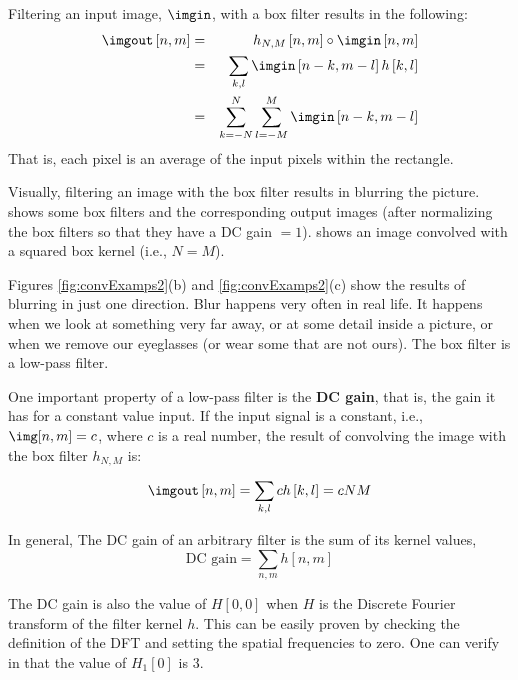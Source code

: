 Filtering an input image, $\imgin$, with a box filter results in the following:
\begin{eqnarray}
\imgout \left[n,m\right] &=& h_{N,M} \left[n,m\right] \circ \imgin \left[n,m\right] \nonumber \\
&=&  \sum_{k,l} \imgin \left[n-k,m-l \right] h \left[k,l \right] \nonumber \\
&=&  \sum_{k=-N}^N \sum_{l=-M}^M \imgin \left[n-k,m-l \right]
\end{eqnarray}
That is, each pixel is an average of the input pixels within the rectangle. 

Visually, filtering an image with the box filter results in blurring the picture. \Fig{\ref{fig:convExamps2}} shows some box filters and the corresponding output images (after normalizing the box filters so that they have a DC gain $= 1$).  shows an image convolved with a squared box kernel (i.e., $N=M$). 

Figures \ref{fig:convExamps2}(b) and \ref{fig:convExamps2}(c)  show the results of blurring in just one direction. Blur happens very often in real life. It happens when we look at something very far away, or at some detail inside a picture, or when we remove our eyeglasses (or wear some that are not ours). The box filter is a low-pass filter. 



One important property of a low-pass filter is the {\bf DC gain}, that is, the gain it has for a constant value input. If the input signal is a constant, i.e., $\img[n,m] = c$, where $c$ is a real number, the result of convolving the image with the box filter $h_{N,M}$ is:

\begin{equation}
\imgout \left[n,m\right] = \sum_{k,l} c h \left[k,l \right] = c N M
\end{equation}

In general, The DC gain of an arbitrary filter is the sum of  its kernel values, 
\begin{equation}
\text{DC~gain} = \sum_{n,m} h[n,m]
\end{equation}

The DC gain is also the value of $H[0,0]$ when $H$ is the Discrete Fourier transform of the filter kernel $h$. This can be easily proven by checking the definition of the DFT and setting the spatial frequencies to zero. One can verify in \fig{\ref{fig:boxfilter}} that the value of $H_1[0]$ is $3$. 

